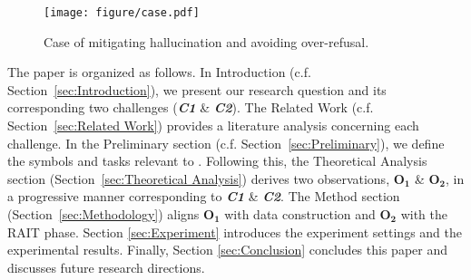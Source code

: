 \begin{figure}[t]
    \centering
    \texttt{[image: figure/case.pdf]}
    \caption{Case of mitigating hallucination and avoiding over-refusal.}
    \label{fig:case}
\end{figure}


The paper is organized as follows. In Introduction (c.f. Section~\ref{sec:Introduction}), we present our research question and its corresponding two challenges (\textit{\textbf{C1}} \& \textit{\textbf{C2}}). The Related Work (c.f. Section~\ref{sec:Related Work}) provides a literature analysis concerning each challenge. In the Preliminary section (c.f. Section~\ref{sec:Preliminary}), we define the symbols and tasks relevant to \M. Following this, the Theoretical Analysis section (Section~\ref{sec:Theoretical Analysis}) derives two observations, $\mathbf{O_1}$ \& $\mathbf{O_2}$, in a progressive manner corresponding to \textit{\textbf{C1}} \& \textit{\textbf{C2}}. The Method section (Section~\ref{sec:Methodology}) aligns $\mathbf{O_1}$ with data construction and $\mathbf{O_2}$ with the RAIT phase. Section \ref{sec:Experiment} introduces the experiment settings and the experimental results. Finally, Section \ref{sec:Conclusion} concludes this paper and discusses future research directions.
